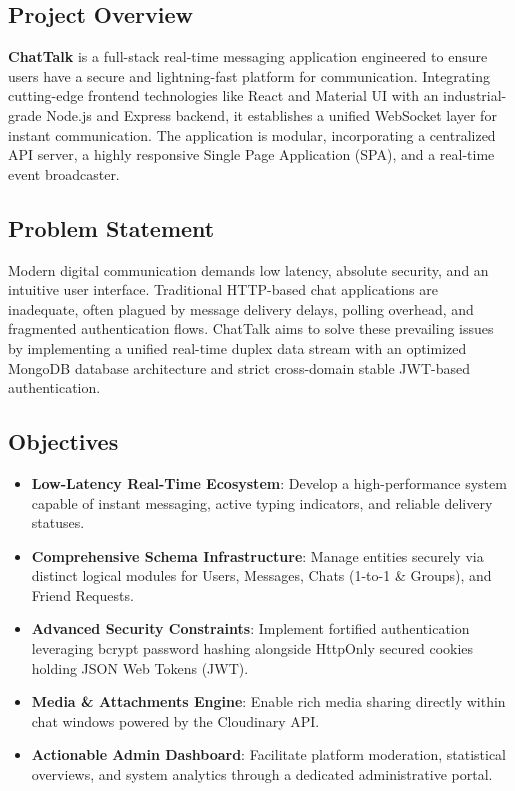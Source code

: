 \documentclass[12pt,a4paper]{article}
\begin{document}
\subsection{Project Overview}
\textbf{ChatTalk} is a full-stack real-time messaging application engineered to ensure users have a secure and lightning-fast platform for communication. Integrating cutting-edge frontend technologies like React and Material UI with an industrial-grade Node.js and Express backend, it establishes a unified WebSocket layer for instant communication. The application is modular, incorporating a centralized API server, a highly responsive Single Page Application (SPA), and a real-time event broadcaster.

\subsection{Problem Statement}
Modern digital communication demands low latency, absolute security, and an intuitive user interface. Traditional HTTP-based chat applications are inadequate, often plagued by message delivery delays, polling overhead, and fragmented authentication flows. ChatTalk aims to solve these prevailing issues by implementing a unified real-time duplex data stream with an optimized MongoDB database architecture and strict cross-domain stable JWT-based authentication.

\subsection{Objectives}
\begin{itemize}
    \item \textbf{Low-Latency Real-Time Ecosystem}: Develop a high-performance system capable of instant messaging, active typing indicators, and reliable delivery statuses.
    \item \textbf{Comprehensive Schema Infrastructure}: Manage entities securely via distinct logical modules for Users, Messages, Chats (1-to-1 \& Groups), and Friend Requests.
    \item \textbf{Advanced Security Constraints}: Implement fortified authentication leveraging bcrypt password hashing alongside HttpOnly secured cookies holding JSON Web Tokens (JWT).
    \item \textbf{Media \& Attachments Engine}: Enable rich media sharing directly within chat windows powered by the Cloudinary API.
    \item \textbf{Actionable Admin Dashboard}: Facilitate platform moderation, statistical overviews, and system analytics through a dedicated administrative portal.
\end{itemize}
\end{document}
